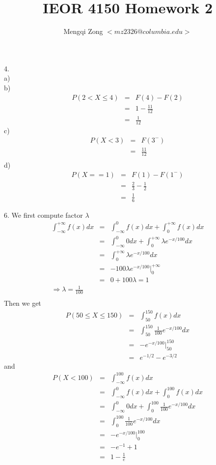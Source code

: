 \documentclass[12pt]{article}
\title{IEOR 4150 Homework 2}
\author{Mengqi Zong $<mz2326@columbia.edu>$}
\begin{document}
\maketitle

\setlength{\parindent}{0in}

4. \\
a) \\
b)
\begin{eqnarray*}
P(2 < X \le 4)
&=& F(4) - F(2) \\
&=& 1 - \frac {11}{12} \\
&=& \frac {1}{12}
\end{eqnarray*}
c)
\begin{eqnarray*}
P(X < 3)
&=& F(3^-) \\
&=& \frac {11}{12}\\
\end{eqnarray*}
d)
\begin{eqnarray*}
P(X == 1)
&=& F(1) - F(1^-) \\
&=& \frac {2}{3} - \frac {1}{2} \\
&=& \frac {1}{6}
\end{eqnarray*}

6. We first compute factor $\lambda$
\begin{eqnarray*}
\int_{-\infty}^{+\infty} f(x) dx
&=& \int_{-\infty}^{0} f(x) dx + \int_{0}^{+\infty} f(x) dx \\
&=& \int_{-\infty}^{0} 0 dx + \int_{0}^{+\infty} \lambda e^{-x/100} dx \\
&=& \int_{0}^{+\infty} \lambda e^{-x/100} dx \\
&=& -100 \lambda e^{-x/100}|_0^{+\infty} \\
&=& 0 + 100 \lambda = 1 \\
\Longrightarrow \lambda = \frac {1}{100} \\
\end{eqnarray*}
Then we get
\begin{eqnarray*}
P(50 \le X \le 150)
&=& \int_{50}^{150} f(x) dx \\
&=& \int_{50}^{150} \frac {1}{100} e^{-x/100} dx \\
&=& -e^{-x/100}|_{50}^{150} \\
&=& e^{-1/2}-e^{-3/2}
\end{eqnarray*}
and
\begin{eqnarray*}
P(X < 100)
&=& \int_{-\infty}^{100} f(x) dx \\
&=& \int_{-\infty}^{0} f(x) dx + \int_{0}^{100} f(x) dx \\
&=& \int_{-\infty}^{0} 0 dx + \int_{0}^{100} \frac {1}{100} e^{-x/100} dx \\
&=& \int_{0}^{100} \frac {1}{100} e^{-x/100} dx \\
&=& -e^{-x/100}|_0^{100} \\
&=& -e^{-1} + 1 \\
&=& 1 - \frac {1}{e}
\end{eqnarray*}
\end{document}
